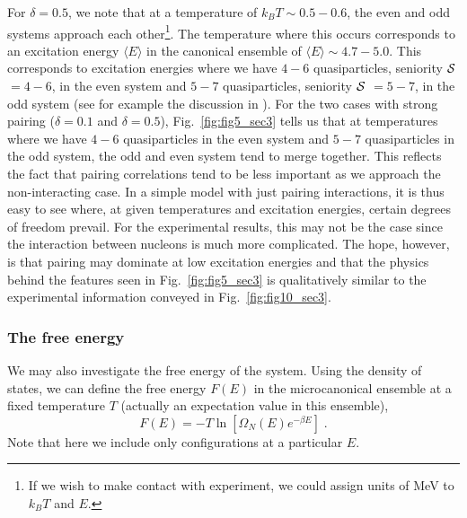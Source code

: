 \documentclass[rmp,preprint,aps,floatfix]{revtex4}
\begin{document}
For $\delta=0.5$, we note that at a 
temperature of $k_BT \sim 0.5-0.6$, the even and odd systems
approach each other\footnote{If we wish to make contact with experiment, 
we could assign units of MeV to $k_BT$ and $E$.}. The 
temperature where this occurs corresponds to an excitation energy 
$\langle E\rangle$ in the canonical ensemble of 
$\langle E\rangle \sim 4.7-5.0$. This corresponds to excitation 
energies where we have $4-6$ quasiparticles, 
seniority ${\cal S}$ $=4-6$, in the even system and 
$5-7$ quasiparticles, seniority ${\cal S}$ $=5-7$, in the odd 
system (see for example the discussion in \cite{entropy2000}).
For the two cases 
with strong pairing ($\delta=0.1$ and $\delta=0.5$), 
Fig.\ \ref{fig:fig5_sec3} tells us that at temperatures where we 
have  $4-6$ quasiparticles in the even system and $5-7$  quasiparticles 
in the odd system, the odd and even system tend to merge 
together. This reflects the fact that pairing correlations tend to be less 
important as we approach the non-interacting case.  
In a simple 
model with just pairing interactions, it is thus easy to see where, 
at given temperatures and excitation energies, certain degrees 
of freedom prevail. For the experimental results, 
this may not be the case since the interaction between nucleons is 
much more complicated. The hope, however, is that pairing may dominate 
at low excitation energies and that the physics behind the 
features seen 
in Fig.\ \ref{fig:fig5_sec3} is qualitatively similar to 
the experimental information conveyed in  Fig.\ \ref{fig:fig10_sec3}.



\subsubsection{The free energy}

We may also investigate the free energy of the system.
Using the density of states, we can define
the  free energy $F(E)$ in the microcanonical ensemble 
at a fixed temperature $T$ (actually an expectation value in this ensemble), 
\begin{equation}
    F(E)=-T\ln\left[\Omega_N(E)e^{-\beta E}\right]\;.
    \label{eq:freenergy}
\end{equation}
Note that here we include only
configurations at a particular $E$.
 
\end{document}

